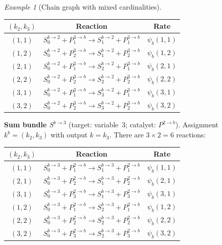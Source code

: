 \documentclass{article}
\theoremstyle{plain}
\theoremstyle{definition}
\theoremstyle{remark}
\newtheorem{example}{Example}[section]
\newcommand{\<}{\langle}
\renewcommand{\>}{\rangle}
\begin{document}
\begin{example}[Chain graph with mixed cardinalities]
\begin{center}
\renewcommand{\arraystretch}{1.3}
\begin{tabular}{@{}ccc@{}}
\toprule
$(k_2,k_3)$ & Reaction & Rate \\
\midrule
$(1,1)$ & $S^{b\to 2}_0 + P^{3\to b}_1 \to S^{b\to 2}_1 + P^{3\to b}_1$ & $\psi_b(1,1)$ \\
$(1,2)$ & $S^{b\to 2}_0 + P^{3\to b}_2 \to S^{b\to 2}_1 + P^{3\to b}_2$ & $\psi_b(1,2)$ \\
$(2,1)$ & $S^{b\to 2}_0 + P^{3\to b}_1 \to S^{b\to 2}_2 + P^{3\to b}_1$ & $\psi_b(2,1)$ \\
$(2,2)$ & $S^{b\to 2}_0 + P^{3\to b}_2 \to S^{b\to 2}_2 + P^{3\to b}_2$ & $\psi_b(2,2)$ \\
$(3,1)$ & $S^{b\to 2}_0 + P^{3\to b}_1 \to S^{b\to 2}_3 + P^{3\to b}_1$ & $\psi_b(3,1)$ \\
$(3,2)$ & $S^{b\to 2}_0 + P^{3\to b}_2 \to S^{b\to 2}_3 + P^{3\to b}_2$ & $\psi_b(3,2)$ \\
\bottomrule
\end{tabular}
\end{center}
 
\smallskip
\noindent\textbf{Sum bundle $S^{b\to 3}$}
(target: variable~$3$; catalyst: $P^{2\to b}$).
Assignment $k^b=(k_2,k_3)$ with output $k=k_3$.
There are $3\times 2 = 6$ reactions:
 
\begin{center}
\renewcommand{\arraystretch}{1.3}
\begin{tabular}{@{}ccc@{}}
\toprule
$(k_2,k_3)$ & Reaction & Rate \\
\midrule
$(1,1)$ & $S^{b\to 3}_0 + P^{2\to b}_1 \to S^{b\to 3}_1 + P^{2\to b}_1$ & $\psi_b(1,1)$ \\
$(2,1)$ & $S^{b\to 3}_0 + P^{2\to b}_2 \to S^{b\to 3}_1 + P^{2\to b}_2$ & $\psi_b(2,1)$ \\
$(3,1)$ & $S^{b\to 3}_0 + P^{2\to b}_3 \to S^{b\to 3}_1 + P^{2\to b}_3$ & $\psi_b(3,1)$ \\
$(1,2)$ & $S^{b\to 3}_0 + P^{2\to b}_1 \to S^{b\to 3}_2 + P^{2\to b}_1$ & $\psi_b(1,2)$ \\
$(2,2)$ & $S^{b\to 3}_0 + P^{2\to b}_2 \to S^{b\to 3}_2 + P^{2\to b}_2$ & $\psi_b(2,2)$ \\
$(3,2)$ & $S^{b\to 3}_0 + P^{2\to b}_3 \to S^{b\to 3}_2 + P^{2\to b}_3$ & $\psi_b(3,2)$ \\
\bottomrule
\end{tabular}
\end{center}
 

\end{example}
\end{document}
